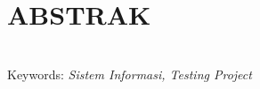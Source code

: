 
\chapter*{ABSTRAK}

\begin{singlespace}
\blindtext \\[20pt]
Keywords: \textit{Sistem Informasi, Testing Project}
\end{singlespace}

\newpage